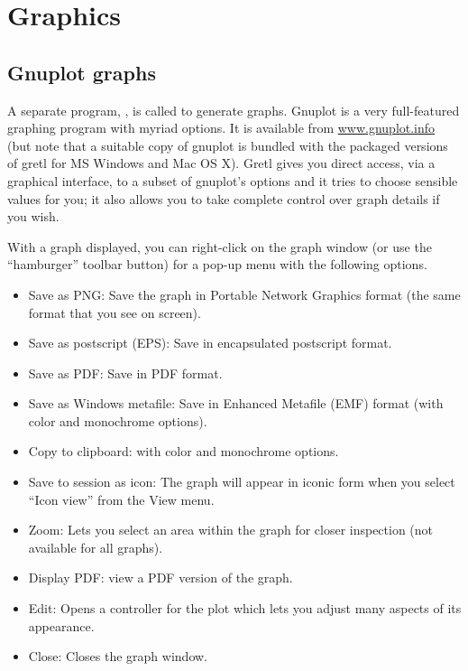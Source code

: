 \chapter{Graphics}
\label{chap:graphs}

\section{Gnuplot graphs}
\label{gnuplot-graphs}

A separate program, , is called to generate graphs.
Gnuplot is a very full-featured graphing program with myriad options.
It is available from \href{http://www.gnuplot.info/}{www.gnuplot.info}
(but note that a suitable copy of gnuplot is bundled with the packaged
versions of gretl for MS Windows and Mac OS X).  Gretl gives you
direct access, via a graphical interface, to a subset of gnuplot's
options and it tries to choose sensible values for you; it also allows
you to take complete control over graph details if you wish.

With a graph displayed, you can right-click on the graph window (or
use the ``hamburger'' toolbar button) for a pop-up menu with the
following options.

\begin{itemize}
\item \textsf{Save as PNG}: Save the graph in Portable Network
  Graphics format (the same format that you see on screen).
\item \textsf{Save as postscript (EPS)}: Save in encapsulated
  postscript format.
\item \textsf{Save as PDF}: Save in PDF format.
\item \textsf{Save as Windows metafile}: Save in Enhanced Metafile
  (EMF) format (with color and monochrome options).
\item \textsf{Copy to clipboard}: with color and monochrome options.
\item \textsf{Save to session as icon}: The graph will appear in
  iconic form when you select ``Icon view'' from the View menu.
\item \textsf{Zoom}: Lets you select an area within the graph for
  closer inspection (not available for all graphs).
\item \textsf{Display PDF}: view a PDF version of the graph.
\item \textsf{Edit}: Opens a controller for the plot which lets you
  adjust many aspects of its appearance.
\item \textsf{Close}: Closes the graph window.
\end{itemize}

